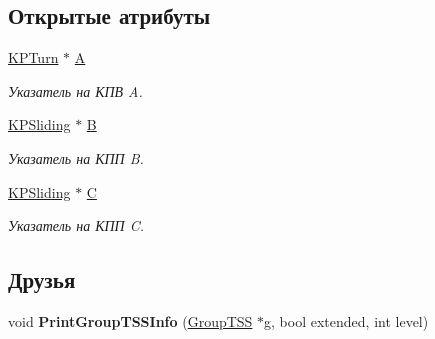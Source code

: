 \subsection*{Открытые атрибуты}
\begin{DoxyCompactItemize}
\item 
\hypertarget{class_group_t_s_s_a08cea0d2fc1d2d13932d44ce2f7fa9e3}{
\hyperlink{class_k_p_turn}{KPTurn} $\ast$ \hyperlink{class_group_t_s_s_a08cea0d2fc1d2d13932d44ce2f7fa9e3}{A}}
\label{class_group_t_s_s_a08cea0d2fc1d2d13932d44ce2f7fa9e3}

\begin{DoxyCompactList}\small\item\em Указатель на КПВ A. \item\end{DoxyCompactList}\item 
\hypertarget{class_group_t_s_s_afe0cfa93fdc337da7fedf7b9f077f79b}{
\hyperlink{class_k_p_sliding}{KPSliding} $\ast$ \hyperlink{class_group_t_s_s_afe0cfa93fdc337da7fedf7b9f077f79b}{B}}
\label{class_group_t_s_s_afe0cfa93fdc337da7fedf7b9f077f79b}

\begin{DoxyCompactList}\small\item\em Указатель на КПП B. \item\end{DoxyCompactList}\item 
\hypertarget{class_group_t_s_s_abea38115241186c92293fad68c17c84c}{
\hyperlink{class_k_p_sliding}{KPSliding} $\ast$ \hyperlink{class_group_t_s_s_abea38115241186c92293fad68c17c84c}{C}}
\label{class_group_t_s_s_abea38115241186c92293fad68c17c84c}

\begin{DoxyCompactList}\small\item\em Указатель на КПП C. \item\end{DoxyCompactList}\end{DoxyCompactItemize}
\subsection*{Друзья}
\begin{DoxyCompactItemize}
\item 
\hypertarget{class_group_t_s_s_a4725574845605b690c83e8032d28b41a}{
void {\bfseries PrintGroupTSSInfo} (\hyperlink{class_group_t_s_s}{GroupTSS} $\ast$g, bool extended, int level)}
\label{class_group_t_s_s_a4725574845605b690c83e8032d28b41a}

\end{DoxyCompactItemize}


